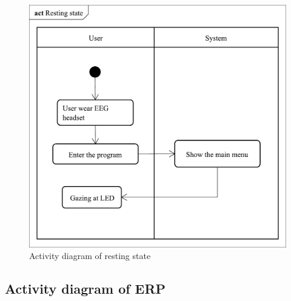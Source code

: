 \begin{figure}[ht]
\centering \includegraphics[scale=0.295]{chapter4/Rest.pdf}
\caption{Activity diagram of resting state}
\end{figure}



\subsection{Activity diagram of ERP}

